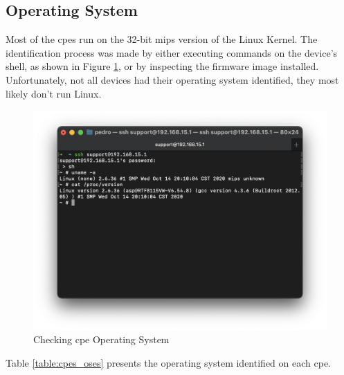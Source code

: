 \subsection{Operating System}

Most of the \glspl{cpe} run on the 32-bit \gls{mips} version of the Linux Kernel. The identification process was made by either executing commands on the device’s shell, as shown in Figure \ref{figure:checking_cpe_operating_system}, or by inspecting the firmware image installed. Unfortunately, not all devices had their operating system identified, they most likely don’t run Linux. 

\begin{figure}[h]
    \centering
    \includegraphics[width=\linewidth]{contents/cpes-and-research-data/operating-system/checking-cpe-operating-system.png}
    \caption{Checking \gls{cpe} Operating System}
    \label{figure:checking_cpe_operating_system}
\end{figure}

Table \ref{table:cpes_oses} presents the operating system identified on each \gls{cpe}.

